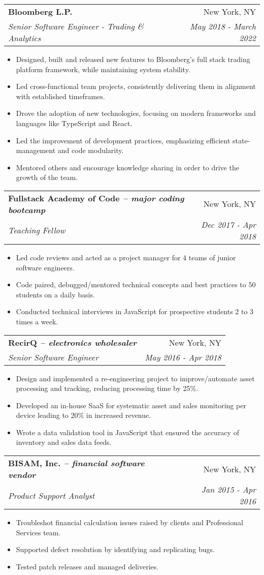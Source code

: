\documentclass[letterpaper,10pt,usenames,dvipsnames]{article}
\makeatletter
\newcommand{\resumeItemSimple}[1]{
  \item\small{
    {#1}{\vspace{-2pt}}
  }
}
\newcommand{\resumeSubheading}[4]{
  \vspace{-1pt}\item
    \begin{tabular*}{0.97\textwidth}{l@{\extracolsep{\fill}}r}
      \textbf{#1} & #2 \\
      \textit{\small#3} & \textit{\small #4} \\
    \end{tabular*}\vspace{-5pt}
}
\newcommand{\resumeItemListStart}{\begin{itemize}}
\newcommand{\resumeItemListEnd}{\end{itemize}\vspace{-5pt}}
\newcommand{\engineerType}{Senior Software Engineer}
\makeatother
\begin{document}
    \resumeSubheading
      {Bloomberg L.P.}{New York, NY}
      {Senior Software Engineer - Trading \& Analytics}{May 2018 - March 2022}
      \resumeItemListStart
        \resumeItemSimple{Designed, built and released new features to Bloomberg's full stack trading platform framework, while maintaining system stability.}
        \resumeItemSimple{Led cross-functional team projects, consistently delivering them in alignment with established timeframes.}
        \resumeItemSimple{Drove the adoption of new technologies, focusing on modern frameworks and languages like TypeScript and React.}
        \resumeItemSimple{Led the improvement of development practices, emphasizing efficient state-management and code modularity.}
        \resumeItemSimple{Mentored others and encourage knowledge sharing in order to drive the growth of the team.}
      \resumeItemListEnd

    \resumeSubheading
      {Fullstack Academy of Code \normalfont\textit{-- major coding bootcamp}}{New York, NY}
      {Teaching Fellow}{Dec 2017 - Apr 2018}
      \resumeItemListStart
        \resumeItemSimple{Led code reviews and acted as a project manager for 4 teams of junior software engineers.}
        \resumeItemSimple{Code paired, debugged/mentored technical concepts and best practices to 50 students on a daily basis.}
        \resumeItemSimple{Conducted technical interviews in JavaScript for prospective students 2 to 3 times a week.}
      \resumeItemListEnd

    \resumeSubheading
      {RecirQ \normalfont\textit{-- electronics wholesaler}}{New York, NY}
      {\engineerType{}}{May 2016 - Apr 2018}
      \resumeItemListStart
      	\resumeItemSimple{Design and implemented a re-engineering project to improve/automate asset processing and tracking, reducing processing time by 25\%.}
        \resumeItemSimple{Developed an in-house SaaS for systematic asset and sales monitoring per device leading to 20\% in increased revenue.}
        \resumeItemSimple{Wrote a data validation tool in JavaScript that ensured the accuracy of inventory and sales data feeds.}
      \resumeItemListEnd

    \resumeSubheading
      {BISAM, Inc. \normalfont\textit{-- financial software vendor}}{New York, NY}
      {Product Support Analyst}{Jan 2015 - Apr 2016}
      \resumeItemListStart
        \resumeItemSimple{Troubleshot financial calculation issues raised by clients and Professional Services team.}
        \resumeItemSimple{Supported defect resolution by identifying and replicating bugs.}
        \resumeItemSimple{Tested patch releases and managed deliveries.}
      \resumeItemListEnd
\end{document}

